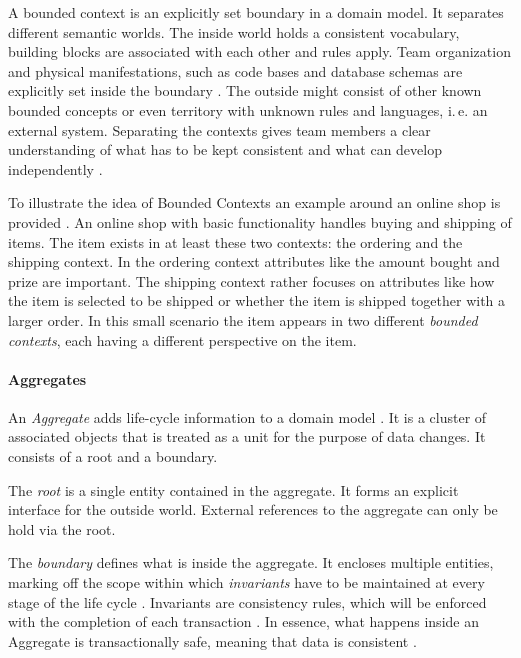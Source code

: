 A bounded context is an explicitly set boundary in a domain model.
It separates different semantic worlds.
The inside world holds a consistent vocabulary, building blocks are associated with each other and rules apply.
Team organization and physical manifestations, such as code bases and database schemas are explicitly set inside the boundary \citep[p. 336]{Evans2004}.
The outside might consist of other known bounded concepts or even territory with unknown rules and languages, i.\,e. an external system.
Separating the contexts gives team members a clear understanding of what has to be kept consistent and what can develop independently \citep[p. 551]{Evans2004}.

To illustrate the idea of Bounded Contexts an example around an online shop is provided \cite[11:00]{RadioDDD2015}. %
An online shop with basic functionality handles buying and shipping of items.
The item exists in at least these two contexts: the ordering and the shipping context.
In the ordering context attributes like the amount bought and prize are important.
The shipping context rather focuses on attributes like how the item is selected to be shipped or whether the item is shipped together with a larger order.
In this small scenario the item appears in two different \textit{bounded contexts}, each having a different perspective on the item.
\cite[13:00]{RadioDDD2015}

\paragraph{Aggregates}
An \textit{Aggregate} adds life-cycle information to a domain model \citep[p. 123f.]{Evans2004}.
It is a cluster of associated objects that is treated as a unit for the purpose of data changes. 
It consists of a root and a boundary.

The \textit{root} is a single entity contained in the aggregate.
It forms an explicit interface for the outside world.
External references to the aggregate can only be hold via the root.

The \textit{boundary} defines what is inside the aggregate.
It encloses multiple entities, marking off the scope within which \textit{invariants} have to be maintained at every stage of the life cycle \citep[p. 126]{Evans2004}.
Invariants are consistency rules, which will be enforced with the completion of each transaction \citep[p. 128]{Evans2004}.
In essence, what happens inside an Aggregate is transactionally safe, meaning that data is consistent \citep[p. 126]{Evans2004}.

